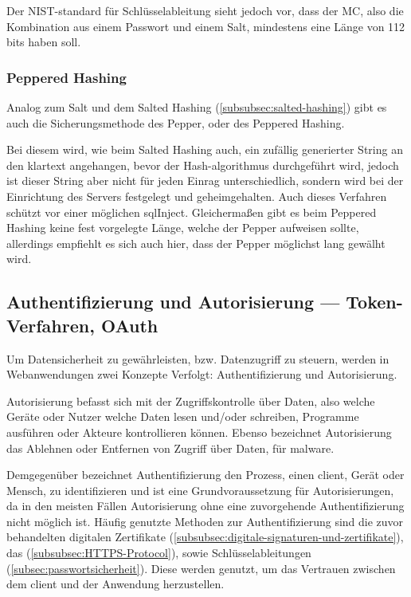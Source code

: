 Der \ac{NIST}-standard für Schlüsselableitung sieht jedoch vor, dass der \ac{MC}, also die Kombination aus einem Passwort und einem Salt, mindestens eine Länge von 112 bits haben soll.\autocite[\vglf][]{NIST:800132}

\subsubsection{Peppered Hashing}\label{subsubsec:peppered-hashing}

Analog zum Salt und dem Salted Hashing (\autoref{subsubsec:salted-hashing}) gibt es auch die Sicherungsmethode des Pepper, oder des Peppered Hashing.

Bei diesem wird, wie beim Salted Hashing auch, ein zufällig generierter String an den \gls{klartext} angehangen, bevor der Hash-\gls{algorithmus} durchgeführt wird, jedoch ist dieser String aber nicht für jeden Einrag unterschiedlich, sondern wird bei der Einrichtung des Servers festgelegt und geheimgehalten\autocite[\vglf][]{Securing39:online}. Auch dieses Verfahren schützt vor einer möglichen \gls{sqlInject}.
Gleichermaßen gibt es beim Peppered Hashing keine fest vorgelegte Länge, welche der Pepper aufweisen sollte, allerdings empfiehlt es sich auch hier, dass der Pepper möglichst lang gewälht wird.


\subsection[Authentifizierung und Autorisierung]{Authentifizierung und Autorisierung — Token-Verfahren, OAuth}\label{subsec:authenticationAuthorization}
Um Datensicherheit zu gewährleisten, bzw. Datenzugriff zu steuern, werden in Webanwendungen zwei Konzepte Verfolgt: Authentifizierung und Autorisierung. 

Autorisierung befasst sich mit der Zugriffskontrolle über Daten, also welche Geräte oder Nutzer welche Daten lesen und/oder schreiben, Programme ausführen oder Akteure kontrollieren können.\autocite[\vglf][]{Auth:2017} Ebenso bezeichnet Autorisierung das Ablehnen oder Entfernen von Zugriff über Daten, \zbol für \gls{malware}.\autocite[\vglf][]{Auth:2017}

Demgegenüber bezeichnet Authentifizierung den Prozess, einen \gls{client}, Gerät oder Mensch, zu identifizieren und ist eine Grundvoraussetzung für Autorisierungen, da in den meisten Fällen Autorisierung ohne eine zuvorgehende Authentifizierung nicht möglich ist.\autocite[\vglf][]{Auth:2017}
Häufig genutzte Methoden zur Authentifizierung sind die zuvor behandelten digitalen Zertifikate (\autoref{subsubsec:digitale-signaturen-und-zertifikate}), das  (\autoref{subsubsec:HTTPS-Protocol}), sowie Schlüsselableitungen (\autoref{subsec:passwortsicherheit}). Diese werden genutzt, um das Vertrauen zwischen dem \gls{client} und der Anwendung herzustellen.\autocite[\vglf][]{Auth:2017}

